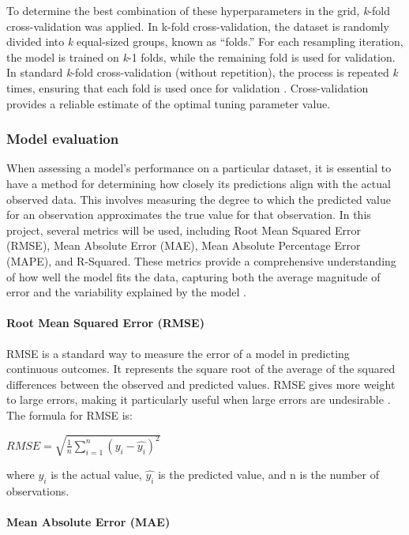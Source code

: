 \documentclass[11pt,a4paper,]{article}
\begin{document}
To determine the best combination of these hyperparameters in the grid, \emph{k}-fold cross-validation was applied. In k-fold cross-validation, the dataset is randomly divided into \emph{k} equal-sized groups, known as ``folds.'' For each resampling iteration, the model is trained on \emph{k}-1 folds, while the remaining fold is used for validation. In standard \emph{k}-fold cross-validation (without repetition), the process is repeated \emph{k} times, ensuring that each fold is used once for validation \autocite{tidymodels}. Cross-validation provides a reliable estimate of the optimal tuning parameter value.

\subsubsection{Model evaluation}\label{model-evaluation}

When assessing a model's performance on a particular dataset, it is essential to have a method for determining how closely its predictions align with the actual observed data. This involves measuring the degree to which the predicted value for an observation approximates the true value for that observation. In this project, several metrics will be used, including Root Mean Squared Error (RMSE), Mean Absolute Error (MAE), Mean Absolute Percentage Error (MAPE), and R-Squared. These metrics provide a comprehensive understanding of how well the model fits the data, capturing both the average magnitude of error and the variability explained by the model \autocite{ISLR,Hastie09}.

\paragraph{Root Mean Squared Error (RMSE)}\label{root-mean-squared-error-rmse}

RMSE is a standard way to measure the error of a model in predicting continuous outcomes. It represents the square root of the average of the squared differences between the observed and predicted values. RMSE gives more weight to large errors, making it particularly useful when large errors are undesirable \autocite{ISLR,Hastie09}. The formula for RMSE is:

\(RMSE = \sqrt{\frac{1}{n} {\sum^n_{i=1}(y_i-\hat{y_i})^2}}\)

where \(y_i\) is the actual value, \(\hat{y_i}\) is the predicted value, and n is the number of observations.

\paragraph{Mean Absolute Error (MAE)}\label{mean-absolute-error-mae}
\end{document}
